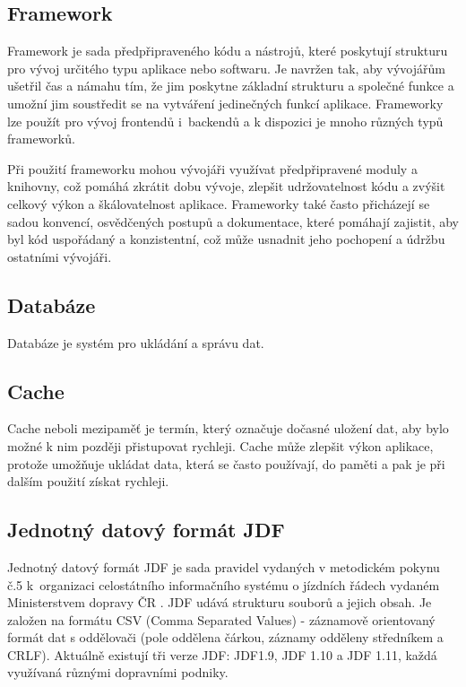 \subsection{Framework}
Framework je sada předpřipraveného kódu a nástrojů, které poskytují strukturu pro vývoj určitého typu aplikace nebo softwaru. \cite{framework} Je navržen tak, aby vývojářům ušetřil čas a námahu tím, že jim poskytne základní strukturu a společné funkce a umožní jim soustředit se na vytváření jedinečných funkcí aplikace. Frameworky lze použít pro vývoj frontendů i~backendů a k dispozici je mnoho různých typů frameworků. \par
Při použití frameworku mohou vývojáři využívat předpřipravené moduly a knihovny, což pomáhá zkrátit dobu vývoje, zlepšit udržovatelnost kódu a zvýšit celkový výkon a škálovatelnost aplikace. Frameworky také často přicházejí se sadou konvencí, osvědčených postupů a dokumentace, které pomáhají zajistit, aby byl kód uspořádaný a konzistentní, což může usnadnit jeho pochopení a údržbu ostatními vývojáři.
\subsection{Databáze}
Databáze je systém pro ukládání a správu dat.
\subsection{Cache}\label{cache}
Cache neboli mezipaměť je termín, který označuje dočasné uložení dat, aby bylo možné k nim později přistupovat rychleji. Cache může zlepšit výkon aplikace, protože umožňuje ukládat data, která se často používají, do paměti a pak je při dalším použití získat rychleji. \par
\subsection[JDF]{Jednotný datový formát JDF}\label{JDF}
Jednotný datový formát JDF je sada pravidel vydaných v metodickém pokynu č.5 k~organizaci celostátního informačního systému o jízdních řádech vydaném Ministerstvem dopravy ČR \cite{jdfpokyn}. JDF udává strukturu souborů a jejich obsah. Je založen na formátu CSV (Comma Separated Values) - záznamově orientovaný formát dat s oddělovači (pole oddělena čárkou, záznamy odděleny středníkem a CRLF). Aktuálně existují tři \newline verze JDF: JDF1.9, JDF 1.10 a JDF 1.11, každá využívaná různými dopravními podniky. \par